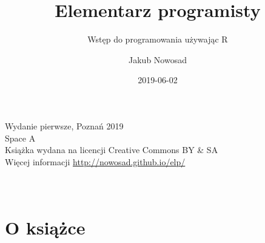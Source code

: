 \documentclass[paper=6in:9in,pagesize=pdftex,headinclude=on,footinclude=on,10pt]{scrbook}
\title{Elementarz programisty}
\subtitle{Wstęp do programowania używając R}
\author{Jakub Nowosad}
\date{2019-06-02}
\let\oldmaketitle\maketitle
\begin{document}
\maketitle

\thispagestyle{empty}


\let\maketitle\oldmaketitle
\maketitle

\thispagestyle{empty}
\vspace*{\fill}
Wydanie pierwsze, Poznań 2019 \\
Space A \\
Książka wydana na licencji Creative Commons BY \& SA \\
Więcej informacji \url{http://nowosad.github.io/elp/} \\
\\
\\

{
\setcounter{tocdepth}{1}
\tableofcontents
}
\hypertarget{o-ksiazce}{%
\chapter*{O książce}\label{o-ksiazce}}
\end{document}
